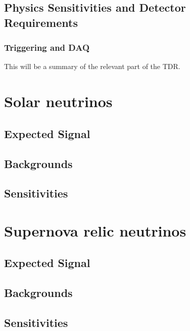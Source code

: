 \subsection{Physics Sensitivities and Detector Requirements}

\subsubsection{Triggering and DAQ}

This will be a summary of the relevant part of the TDR.

\section{Solar neutrinos}
\label{sec:snb-lowe-solar}



\subsection{Expected Signal}

\subsection{Backgrounds}

\subsection{Sensitivities}

\section{Supernova relic neutrinos}
\label{sec:snb-lowe-relic}

\subsection{Expected Signal}

\subsection{Backgrounds}

\subsection{Sensitivities}

